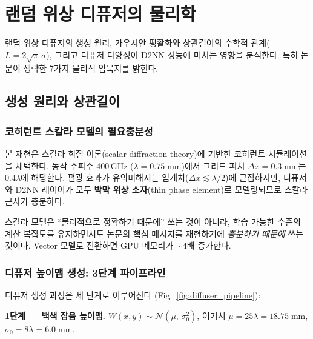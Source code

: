 \documentclass[11pt, a4paper]{article}
\begin{document}

\section{랜덤 위상 디퓨저의 물리학}\label{sec:diffuser}

\begin{insightbox}[Abstract]
랜덤 위상 디퓨저의 생성 원리, 가우시안 평활화와 상관길이의 수학적 관계($L = 2\sqrt{\pi}\,\sigma$), 그리고 디퓨저 다양성이 D2NN 성능에 미치는 영향을 분석한다. 특히 논문이 생략한 7가지 물리적 암묵지를 밝힌다.
\end{insightbox}

\subsection{생성 원리와 상관길이}

\subsubsection{코히런트 스칼라 모델의 필요충분성}

본 재현은 스칼라 회절 이론(scalar diffraction theory)에 기반한 코히런트 시뮬레이션을 채택한다. 동작 주파수 400\,GHz ($\lambda = 0.75\;\text{mm}$)에서 그리드 피치 $\Delta x = 0.3\;\text{mm}$는 $0.4\lambda$에 해당한다. 편광 효과가 유의미해지는 임계치($\Delta x \lesssim \lambda/2$)에 근접하지만, 디퓨저와 D2NN 레이어가 모두 \textbf{박막 위상 소자}(thin phase element)로 모델링되므로 스칼라 근사가 충분하다.

\begin{tkbox}
스칼라 모델은 ``물리적으로 정확하기 때문에'' 쓰는 것이 아니라, 학습 가능한 수준의 계산 복잡도를 유지하면서도 논문의 핵심 메시지를 재현하기에 \textit{충분하기 때문에} 쓰는 것이다. Vector 모델로 전환하면 GPU 메모리가 $\sim$4배 증가한다.
\end{tkbox}

\subsubsection{디퓨저 높이맵 생성: 3단계 파이프라인}

디퓨저 생성 과정은 세 단계로 이루어진다 (Fig.~\ref{fig:diffuser_pipeline}):

\textbf{1단계 --- 백색 잡음 높이맵.}\quad
$W(x,y) \sim \mathcal{N}(\mu,\,\sigma_0^2)$, 여기서 $\mu = 25\lambda = 18.75\;\text{mm}$, $\sigma_0 = 8\lambda = 6.0\;\text{mm}$.
\end{document}
